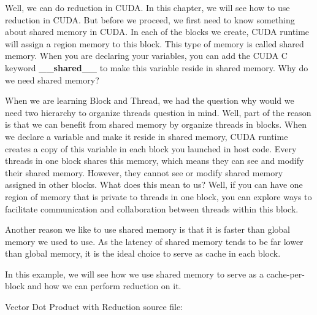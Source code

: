 \documentclass[letterpaper,10pt,english]{sphinxmanual}
\begin{document}
Well, we can do reduction in CUDA. In this chapter, we will see how to use reduction in CUDA. But before we proceed, we first need to know something about shared memory in CUDA. In each of the blocks we create, CUDA runtime will assign a region memory to this block. This type of memory is called shared memory. When you are declaring your variables, you can add the CUDA C keyword \textbf{\_\_shared\_\_} to make this variable reside in shared memory. Why do we need shared memory?

When we are learning Block and Thread, we had the question why would we need two hierarchy to organize threads question in mind. Well, part of the reason is that we can benefit from shared memory by organize threads in blocks. When we declare a variable and make it reside in shared memory, CUDA runtime creates a copy of this variable in each block you launched in host code. Every threads in one block shares this memory, which means they can see and modify their shared memory. However, they cannot see or modify shared memory assigned in other blocks. What does this mean to us? Well, if you can have one region of memory that is private to threads in one block, you can explore ways to facilitate communication and collaboration between threads within this block.

Another reason we like to use shared memory is that it is faster than global memory we used to use. As the latency of shared memory tends to be far lower than global memory, it is the ideal choice to serve as cache in each block.

In this example, we will see how we use shared memory to serve as a cache-per-block and how we can perform reduction on it.

Vector Dot Product with Reduction source file:
\end{document}
